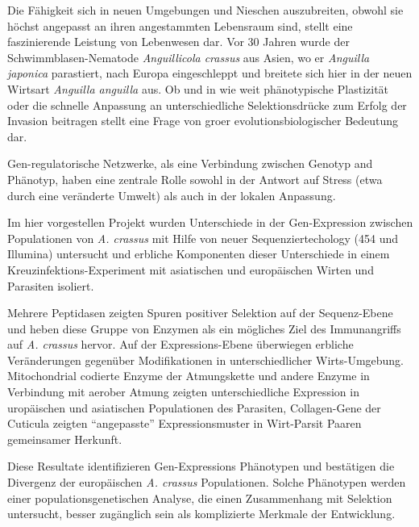 

\begin{zusammenfassunglong}        %


  Die F\"ahigkeit sich in neuen Umgebungen und Nieschen auszubreiten,
  obwohl sie h\"ochst angepasst an ihren angestammten Lebensraum sind,
  stellt eine faszinierende Leistung von Lebenwesen dar. Vor 30 Jahren
  wurde der Schwimmblasen-Nematode \textit{Anguillicola crassus} aus
  Asien, wo er \textit{Anguilla japonica} parastiert, nach Europa
  eingeschleppt und breitete sich hier in der neuen Wirtsart
  \textit{Anguilla anguilla} aus. Ob und in wie weit ph\"anotypische
  Plastizit\"at oder die schnelle Anpassung an unterschiedliche
  Selektionsdr\"ucke zum Erfolg der Invasion beitragen stellt eine Frage
  von groer evolutionsbiologischer Bedeutung dar.

  Gen-regulatorische Netzwerke, als eine Verbindung zwischen Genotyp
  and Ph\"anotyp, haben eine zentrale Rolle sowohl in der Antwort auf
  Stress (etwa durch eine ver\"anderte Umwelt) als auch in der lokalen
  Anpassung.

  Im hier vorgestellen Projekt wurden Unterschiede in der
  Gen-Expression zwischen Populationen von \textit{A. crassus} mit
  Hilfe von neuer Sequenziertechology (454 und Illumina) untersucht
  und erbliche Komponenten dieser Unterschiede in einem
  Kreuzinfektions-Experiment mit asiatischen und europ\"aischen Wirten
  und Parasiten isoliert.

  Mehrere Peptidasen zeigten Spuren positiver Selektion auf der
  Sequenz-Ebene und heben diese Gruppe von Enzymen als ein m\"ogliches
  Ziel des Immunangriffs auf \textit{A. crassus} hervor. Auf der
  Expressions-Ebene \"uberwiegen erbliche Ver\"anderungen gegen\"uber
  Modifikationen in unterschiedlicher Wirts-Umgebung. Mitochondrial
  codierte Enzyme der Atmungskette und andere Enzyme in Verbindung mit
  aerober Atmung zeigten unterschiedliche Expression in urop\"aischen
  und asiatischen Populationen des Parasiten, Collagen-Gene der
  Cuticula zeigten ``angepasste'' Expressionsmuster in Wirt-Parsit
  Paaren gemeinsamer Herkunft.

  Diese Resultate identifizieren Gen-Expressions Ph\"anotypen und
  best\"atigen die Divergenz der europ\"aischen \textit{A. crassus}
  Populationen. Solche Ph\"anotypen werden einer
  populationsgenetischen Analyse, die einen Zusammenhang mit Selektion
  untersucht, besser zug\"anglich sein als komplizierte Merkmale der
  Entwicklung.

\end{zusammenfassunglong}






